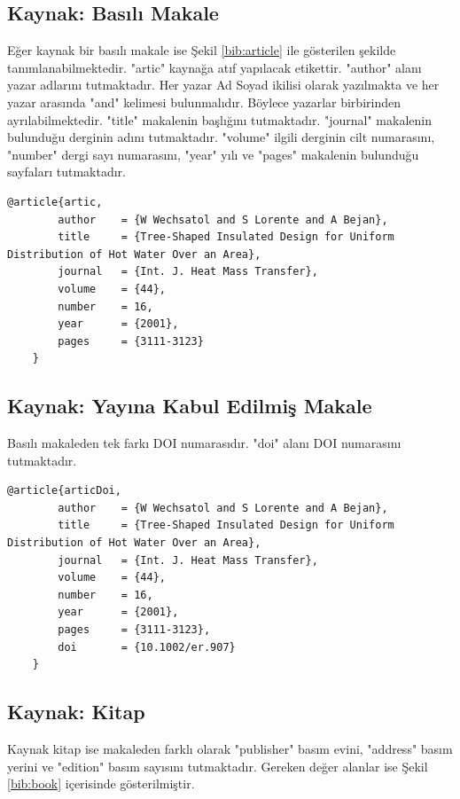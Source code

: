 \subsection{Kaynak: Basılı Makale}
Eğer kaynak bir basılı makale ise Şekil \ref{bib:article} ile gösterilen şekilde tanımlanabilmektedir. "artic" kaynağa atıf yapılacak etikettir. "author" alanı yazar adlarını tutmaktadır. Her yazar Ad Soyad ikilisi olarak yazılmakta ve her yazar arasında "and" kelimesi bulunmalıdır. Böylece yazarlar birbirinden ayrılabilmektedir. "title" makalenin başlığını tutmaktadır. "journal" makalenin bulunduğu derginin adını tutmaktadır. "volume" ilgili derginin cilt numarasını, "number" dergi sayı numarasını, "year" yılı ve "pages" makalenin bulunduğu sayfaları tutmaktadır.

\begin{lstlisting}[language={[LaTeX]{TeX}}, label=bib:article, caption=Kaynak basılı bir makale ise]
	@article{artic,
		author    = {W Wechsatol and S Lorente and A Bejan},
		title     = {Tree-Shaped Insulated Design for Uniform Distribution of Hot Water Over an Area},
		journal   = {Int. J. Heat Mass Transfer},
		volume    = {44},
		number    = 16,
		year      = {2001},
		pages     = {3111-3123}
	}	
\end{lstlisting}

\subsection{Kaynak: Yayına Kabul Edilmiş Makale}
Basılı makaleden tek farkı DOI numarasıdır. "doi" alanı DOI numarasını tutmaktadır.

\begin{lstlisting}[language={[LaTeX]{TeX}}, label=bib:articleDOI, caption=Kaynak kabul edilmiş bir makale ise]
	@article{articDoi,
		author    = {W Wechsatol and S Lorente and A Bejan},
		title     = {Tree-Shaped Insulated Design for Uniform Distribution of Hot Water Over an Area},
		journal   = {Int. J. Heat Mass Transfer},
		volume    = {44},
		number    = 16,
		year      = {2001},
		pages     = {3111-3123},
		doi		  = {10.1002/er.907}
	}	
\end{lstlisting}


\subsection{Kaynak: Kitap}

Kaynak kitap ise makaleden farklı olarak "publisher" basım evini, "address" basım yerini ve "edition" basım sayısını tutmaktadır. Gereken değer alanlar ise Şekil \ref{bib:book} içerisinde gösterilmiştir.

